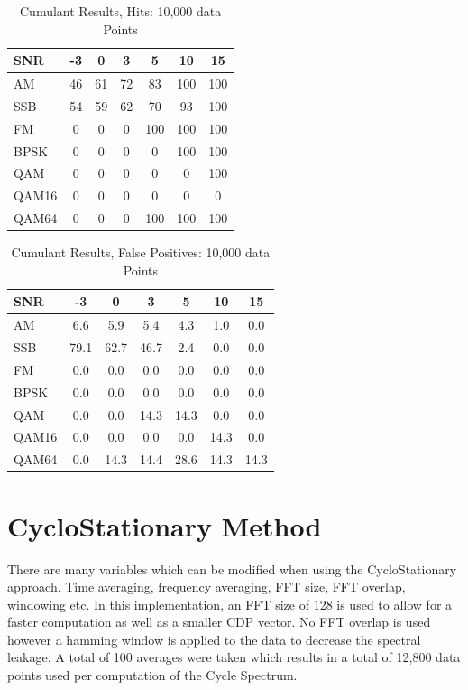  
\begin{table}
\caption{Cumulant Results, Hits: 10,000 data Points}
\centering
\begin{tabular}{ l | c | c | c | c | c | c } \hline
SNR   &	 -3 &	 0 &	 3 &	 5 &	 10 &	 15\\ \hline \hline 
AM    &	 46 &	 61 &	 72 &	 83 &	 100 &	 100 \\ \hline 
SSB   &	 54 &	 59 &	 62 &	 70 &	 93 &	 100 \\ \hline 
FM    &	 0 &	 0 &	 0 &	 100 &	 100 &	 100 \\ \hline 
BPSK  &	 0 &	 0 &	 0 &	 0 &	 100 &	 100 \\ \hline 
QAM   &	 0 &	 0 &	 0 &	 0 &	 0 &	 100 \\ \hline 
QAM16 &	 0 &	 0 &	 0 &	 0 &	 0 &	 0 \\ \hline 
QAM64 &	 0 &	 0 &	 0 &	 100 &	 100 &	 100 \\ \hline 
\end{tabular}
\label{tab:cumHit10000pt}
\end{table}

\begin{table}
\caption{Cumulant Results, False Positives: 10,000 data Points}
\centering
\begin{tabular}{ l | c | c | c | c | c | c } \hline
SNR   &	 -3 &	 0 &	 3 &	 5 &	 10 &	 15\\ \hline \hline 
AM &	 6.6 &	 5.9 &	 5.4 &	 4.3 &	 1.0 &	 0.0 \\ \hline 
SSB &	 79.1 &	 62.7 &	 46.7 &	 2.4 &	 0.0 &	 0.0 \\ \hline 
FM &	 0.0 &	 0.0 &	 0.0 &	 0.0 &	 0.0 &	 0.0  \\ \hline 
BPSK &	 0.0 &	 0.0 &	 0.0 &	 0.0 &	 0.0 &	 0.0 \\ \hline 
QAM &	 0.0 &	 0.0 &	 14.3 &	 14.3 &	 0.0 &	 0.0 \\ \hline 
QAM16 &	 0.0 &	 0.0 &	 0.0 &	 0.0 &	 14.3 &	 0.0 \\ \hline 
QAM64 &	 0.0 &	 14.3 &	 14.4 &	 28.6 &	 14.3 &	 14.3 \\ \hline 
\end{tabular}
\label{tab:cumFalsePositive10000pt}
\end{table}

\newpage
\section{CycloStationary Method}

There are many variables which can be modified when using the CycloStationary
approach.  Time averaging, frequency averaging, FFT size, FFT overlap, windowing
etc.  In this implementation, an FFT size of 128 is used to allow for a faster
computation as well as a smaller CDP vector.  No FFT overlap is used however a
hamming window is applied to the data to decrease the spectral leakage.  A total
of 100 averages were taken which results in a total of 12,800 data points used
per computation of the Cycle Spectrum.


